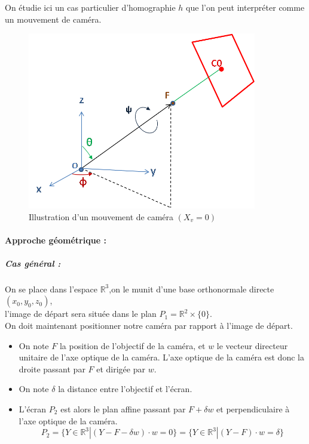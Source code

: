 







On étudie ici un cas particulier d'homographie $h$   que l'on peut interpréter comme un mouvement de caméra.\\
\begin{figure}[h!]
\centering
\includegraphics[width=10cm]{shema_decomp.png}
\caption{Illustration d'un mouvement de caméra $(X_v =0)$}
\end{figure}

\paragraph{Approche géométrique :}
\subparagraph{Cas général :}
On se place dans l'espace $\mathbb{R}^{3}$,on le munit d'une base orthonormale directe $(x_{0},y_{0},z_{0})$,\\ l'image de départ sera située dans le plan $P_{1}= \mathbb{R}^{2}\times \{0\}$.\\
On doit maintenant positionner notre caméra par rapport à l'image de départ.
\begin{itemize}
\item On note $F$ la position de l'objectif de la caméra, et $w$ le vecteur directeur unitaire de l'axe optique de la caméra. L'axe optique de la caméra est donc la droite passant par $F$ et dirigée par $w$.
\item On note $\delta$ la distance entre l'objectif et l'écran.
\item L'écran $P_{2}$ est alors le plan affine passant par $F+\delta w$ et perpendiculaire à l'axe optique de la caméra.
\begin{equation*}
P_{2}=\{Y\in \mathbb{R}^{3}|(Y-F-\delta w)\cdot w=0\}=\{Y\in \mathbb{R}^{3}|(Y-F)\cdot w=\delta\}
\end{equation*}
\end{itemize}

